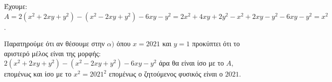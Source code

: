 
\begin{alist}
\item Έχουμε: $A = 2(x^2 + 2xy + y^2) - (x^2 - 2xy + y^2) - 6xy - y^2 = 2x^2 + 4xy + 2y^2 - x^2 + 2xy - y^2 - 6xy - y^2 = x^2$.

\item Παρατηρούμε ότι αν θέσουμε στην $\alpha)$ όπου $x = 2021$ και $y=1$ προκύπτει ότι το
αριστερό μέλος είναι της μορφής: $2(x^2 + 2xy + y^2) - (x^2 - 2xy + y^2) - 6xy - y^2$ άρα
θα είναι ίσο με το $A$, επομένως και ίσο με το $x^2 = 2021^2$ επομένως ο ζητούμενος
φυσικός είναι ο $2021$.
\end{alist}

